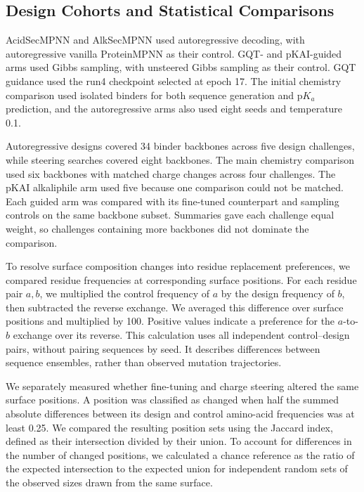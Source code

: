 \subsection{Design Cohorts and Statistical Comparisons}
\label{app:jaxka-design-statistics}

AcidSecMPNN and AlkSecMPNN used autoregressive decoding, with autoregressive vanilla ProteinMPNN as their control. GQT- and pKAI-guided arms used Gibbs sampling, with unsteered Gibbs sampling as their control. GQT guidance used the run4 checkpoint selected at epoch 17. The initial chemistry comparison used isolated binders for both sequence generation and $\mathrm{p}K_a$ prediction, and the autoregressive arms also used eight seeds and temperature 0.1.

Autoregressive designs covered 34 binder backbones across five design challenges, while steering searches covered eight backbones. The main chemistry comparison used six backbones with matched charge changes across four challenges. The pKAI alkaliphile arm used five because one comparison could not be matched. Each guided arm was compared with its fine-tuned counterpart and sampling controls on the same backbone subset. Summaries gave each challenge equal weight, so challenges containing more backbones did not dominate the comparison.

To resolve surface composition changes into residue replacement preferences, we compared residue frequencies at corresponding surface positions. For each residue pair $a,b$, we multiplied the control frequency of $a$ by the design frequency of $b$, then subtracted the reverse exchange. We averaged this difference over surface positions and multiplied by 100. Positive values indicate a preference for the $a$-to-$b$ exchange over its reverse. This calculation uses all independent control--design pairs, without pairing sequences by seed. It describes differences between sequence ensembles, rather than observed mutation trajectories.

We separately measured whether fine-tuning and charge steering altered the same surface positions. A position was classified as changed when half the summed absolute differences between its design and control amino-acid frequencies was at least 0.25. We compared the resulting position sets using the Jaccard index, defined as their intersection divided by their union. To account for differences in the number of changed positions, we calculated a chance reference as the ratio of the expected intersection to the expected union for independent random sets of the observed sizes drawn from the same surface.

